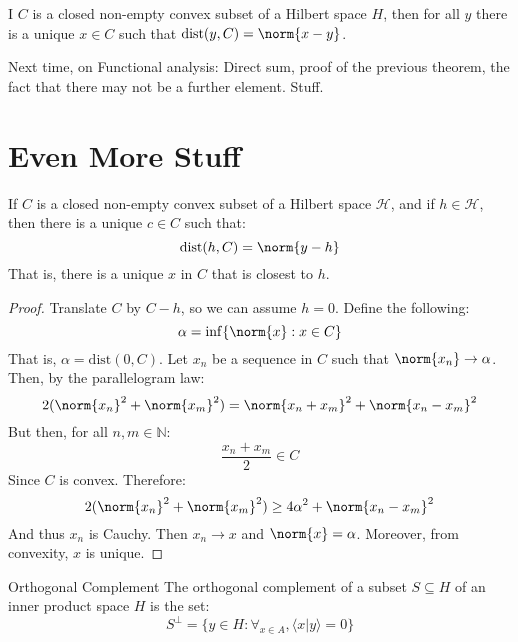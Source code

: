     \begin{theorem}
        I $C$ is a closed non-empty convex subset of a Hilbert
        space $H$, then for all $y$ there is a unique
        $x\in{C}$ such that $\mathrm{dist}(y,C)=\norm{x-y}$.
    \end{theorem}
    Next time, on Functional analysis:
    Direct sum, proof of the previous theorem, the fact
    that there may not be a further element. Stuff.
\chapter{Even More Stuff}
    \begin{theorem}
        If $C$ is a closed non-empty convex subset of a
        Hilbert space $\mathcal{H}$, and if
        $h\in\mathcal{H}$, then there is a unique
        $c\in{C}$ such that:
        \begin{equation}
            \mathrm{dist}(h,C)=\norm{y-h}
        \end{equation}
        That is, there is a unique $x$ in $C$ that is
        closest to $h$.
    \end{theorem}
    \begin{proof}
        Translate $C$ by $C-h$, so we can assume $h=0$.
        Define the following:
        \begin{equation}
            \alpha=\inf\{\norm{x}:x\in{C}\}
        \end{equation}
        That is, $\alpha=\mathrm{dist}(0,C)$. Let $x_{n}$
        be a sequence in $C$ such that
        $\norm{x_{n}}\rightarrow\alpha$. Then, by the
        parallelogram law:
        \begin{equation}
            2(\norm{x_{n}}^{2}+\norm{x_{m}}^{2})=
            \norm{x_{n}+x_{m}}^{2}+
            \norm{x_{n}-x_{m}}^{2}
        \end{equation}
        But then, for all $n,m\in\mathbb{N}$:
        \begin{equation}
            \frac{x_{n}+x_{m}}{2}\in{C}
        \end{equation}
        Since $C$ is convex. Therefore:
        \begin{equation}
            2(\norm{x_{n}}^{2}+\norm{x_{m}}^{2})
            \geq4\alpha^{2}+\norm{x_{n}-x_{m}}^{2}
        \end{equation}
        And thus $x_{n}$ is Cauchy. Then
        $x_{n}\rightarrow{x}$ and $\norm{x}=\alpha$.
        Moreover, from convexity, $x$ is unique.
    \end{proof}
    \begin{ldefinition}{Orthogonal Complement}
        The orthogonal complement of a subset
        $S\subseteq{H}$ of an inner product space
        $H$ is the set:
        \begin{equation}
            S^{\perp}=\{y\in{H}:\forall_{x\in{A}},
                \langle{x|y}\rangle=0\}
        \end{equation}
    \end{ldefinition}

